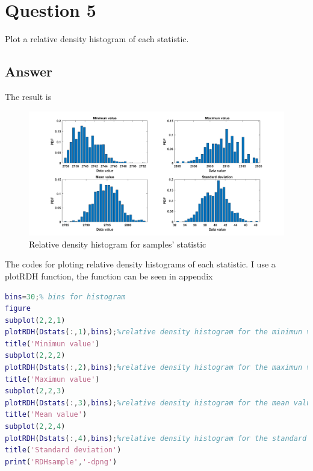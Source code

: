 \documentclass[
	12pt, %
]{fphw}
\begin{document}

\section*{Question 5 }

\begin{problem}
Plot a relative density histogram of each statistic.

\end{problem}


\subsection*{Answer}

The result is

\begin{figure}[htbp]
	\centering
	\includegraphics[width=0.9\columnwidth]{RDHsample.png} 
	\caption{Relative density histogram for samples' statistic}
\end{figure}

The codes for ploting relative density histograms of each statistic. I use a plotRDH function, the function can be seen in appendix

\begin{lstlisting}[language=Matlab,escapeinside=``]
bins=30;% bins for histogram
figure
subplot(2,2,1)
plotRDH(Dstats(:,1),bins);%relative density histogram for the minimun value
title('Minimun value')
subplot(2,2,2)
plotRDH(Dstats(:,2),bins);%relative density histogram for the maximun value
title('Maximun value')
subplot(2,2,3)
plotRDH(Dstats(:,3),bins);%relative density histogram for the mean value
title('Mean value')
subplot(2,2,4)
plotRDH(Dstats(:,4),bins);%relative density histogram for the standard deviation value
title('Standard deviation')
print('RDHsample','-dpng')
\end{lstlisting}
\end{document}
